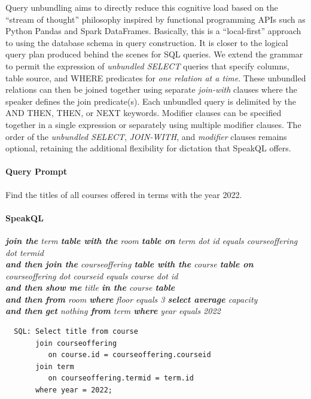Query unbundling aims to directly reduce this cognitive load based on the ``stream of thought'' philosophy inspired by functional programming APIs such as Python Pandas and Spark DataFrames.
Basically, this is a ``local-first'' approach to using the database schema in query construction. 
It is closer to the logical query plan produced behind the scenes for SQL queries. 
We extend the grammar to permit the expression of \emph{unbundled SELECT} queries that specify columns, table source, and WHERE predicates for \textit{one relation at a time}. 
These unbundled relations can then be joined together using separate \emph{join-with} clauses where the speaker defines the join predicate(s). 
Each unbundled query is delimited by the AND THEN, THEN, or NEXT keywords.
Modifier clauses can be specified together in a single expression or separately using multiple modifier clauses. 
The order of the \emph{unbundled SELECT}, \emph{JOIN-WITH}, and \emph{modifier} clauses remains optional, retaining the additional flexibility for dictation that SpeakQL offers.

\paragraph{Query Prompt} Find the titles of all courses offered in terms with the year 2022. 

\paragraph{SpeakQL} 
\emph{
  \textbf{join the} term \textbf{table with the} room \textbf{table on} term dot id equals courseoffering dot termid \\
  \textbf{and then}
  \textbf{join the} courseoffering \textbf{table with the} course \textbf{table on} courseoffering dot courseid equals course dot id \\
  \textbf{and then}
  \textbf{show me} title \textbf{in the} course \textbf{table} \\
  \textbf{and then}
  \textbf{from} room \textbf{where} floor equals 3 \textbf{select average} capacity \\
  \textbf{and then}
  \textbf{get} nothing \textbf{from} term \textbf{where} year equals 2022
}
\begin{verbatim}
  SQL: Select title from course
       join courseoffering 
          on course.id = courseoffering.courseid
       join term 
          on courseoffering.termid = term.id
       where year = 2022;
\end{verbatim}

